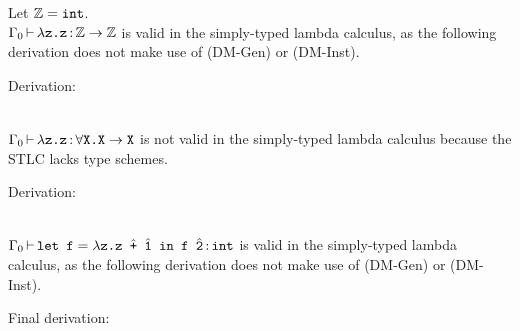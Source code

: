 \documentclass{amsart}
\begin{document}
\begin{solution}
  Let \(\mathbb{Z} = \mono{int}\).
  \ \\

  \noindent
  \(\Gamma_0 \entails \lambda \mono{z.z} \inhabits \mathbb{Z} \to \mathbb{Z}\)
  is valid in the simply-typed lambda calculus, as the following derivation does
  not make use of (DM-Gen) or (DM-Inst).

  Derivation:
  \begin{prooftree}
  \end{prooftree}
  \ \\

  \noindent
  \(\Gamma_0 \entails \lambda \mono{z.z} \inhabits \forall \mono{X.X} \to
  \mono{X}\)
  is not valid in the simply-typed lambda calculus because the STLC lacks type
  schemes.

  Derivation:
  \begin{prooftree}
  \end{prooftree}
  \ \\

  \noindent
  \(\Gamma_0 \entails \mono{let f} = \lambda \mono{z.z }
    \hat{\mono{+}} \mono{ } \hat{\mono{1}} \mono{ in f } \hat{\mono{2}}
    \inhabits \mono{int}\)
  is valid in the simply-typed lambda calculus, as the following derivation does
  not make use of (DM-Gen) or (DM-Inst).

  Final derivation:
  \begin{prooftree}
  \end{prooftree}


\end{solution}
\end{document}
